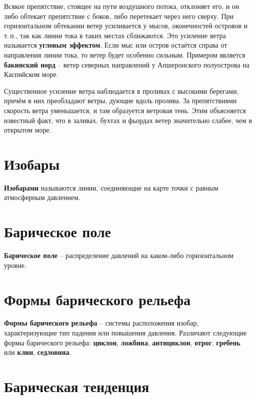 \documentclass[a4paper, 12pt, twoside, final, book, russian, fittopage, cyremdash, openright]{ncc}
\begin{document}
Всякое препятствие, стоящее на пути воздушного потока, отклоняет его,
и он либо обтекает препятствие с боков, либо перетекает через него
сверху. При горизонтальном обтекании ветер усиливается у мысов,
оконечностей островов и т.\,п., так как линии тока в таких местах
сближаются. Это усиление ветра называется \textbf{угловым
  эффектом}. Если мыс или остров остаётся справа
от направления линии тока, то ветер будет особенно сильным. Примером
является \textbf{бакинский норд} \--- ветер
северных направлений у Апшеронского полуострова на Каспийском море.

Существенное усиление ветра наблюдается в проливах с высокими
берегами, причём в них преобладают ветры, дующие вдоль пролива.  За
препятствиями скорость ветра уменьшается, и там образуется ветровая
тень. Этим объясняется известный факт, что в заливах, бухтах и фьордах
ветер значительно слабее, чем в открытом море.

\section{Изобары}
\label{sec:isobars}

\textbf{Изобарами} называются линии, соединяющие на карте точки с равным атмосферным давлением.

\section{Барическое поле}
\label{sec:baric_field}

\textbf{Барическое поле} \--- распределение давлений на каком-либо горизонтальном уровне.

\section{Формы барического рельефа}
\label{sec:baric_relief}

\textbf{Формы барического рельефа}
\--- системы расположения изобар, характеризующие тип падения или
повышения давления. Различают следующие формы барического рельефа:
\textbf{циклон}, \textbf{ложбина}, \textbf{антициклон},
\textbf{отрог}, \textbf{гребень} или \textbf{клин},
\textbf{седловина}.

\section{Барическая тенденция}
\label{sec:baric_tendency}
\end{document}
